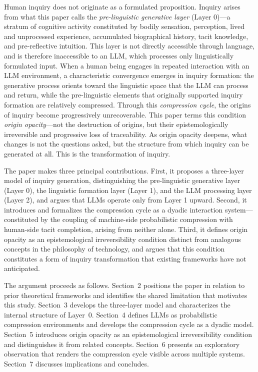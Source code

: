 \documentclass[12pt]{article}
\begin{document}
Human inquiry does not originate as a formulated proposition. Inquiry arises from what this paper calls the \emph{pre-linguistic generative layer} (Layer 0)---a stratum of cognitive activity constituted by bodily sensation, perception, lived and unprocessed experience, accumulated biographical history, tacit knowledge, and pre-reflective intuition. This layer is not directly accessible through language, and is therefore inaccessible to an LLM, which processes only linguistically formulated input. When a human being engages in repeated interaction with an LLM environment, a characteristic convergence emerges in inquiry formation: the generative process orients toward the linguistic space that the LLM can process and return, while the pre-linguistic elements that originally supported inquiry formation are relatively compressed. Through this \emph{compression cycle}, the origins of inquiry become progressively unrecoverable. This paper terms this condition \emph{origin opacity}---not the destruction of origins, but their epistemologically irreversible and progressive loss of traceability. As origin opacity deepens, what changes is not the questions asked, but the structure from which inquiry can be generated at all. This is the transformation of inquiry.

The paper makes three principal contributions. First, it proposes a three-layer model of inquiry generation, distinguishing the pre-linguistic generative layer (Layer 0), the linguistic formation layer (Layer 1), and the LLM processing layer (Layer 2), and argues that LLMs operate only from Layer 1 upward. Second, it introduces and formalizes the compression cycle as a dyadic interaction system---constituted by the coupling of machine-side probabilistic compression with human-side tacit completion, arising from neither alone. Third, it defines origin opacity as an epistemological irreversibility condition distinct from analogous concepts in the philosophy of technology, and argues that this condition constitutes a form of inquiry transformation that existing frameworks have not anticipated.

The argument proceeds as follows. Section~2 positions the paper in relation to prior theoretical frameworks and identifies the shared limitation that motivates this study. Section~3 develops the three-layer model and characterizes the internal structure of Layer~0. Section~4 defines LLMs as probabilistic compression environments and develops the compression cycle as a dyadic model. Section~5 introduces origin opacity as an epistemological irreversibility condition and distinguishes it from related concepts. Section~6 presents an exploratory observation that renders the compression cycle visible across multiple systems. Section~7 discusses implications and concludes.
\end{document}
